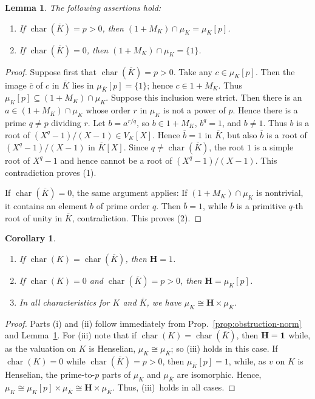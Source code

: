 \documentclass[11pt]{article}
\numberwithin{equation}{section}
\theoremstyle{plain}
\newtheorem{lemma}[theorem]{Lemma}
\newtheorem{corollary}[theorem]{Corollary}
\theoremstyle{remark}
\newcommand{\opn}{\operatorname}
\newcommand{\charr}{\opn{char}}
\newcommand{\ov}{\overline}
\newcommand{\bH}{\mathbf{H}}
\begin{document}
\begin{lemma}
\label{lem:roots-of-unity-s}
\textit{The following assertions hold:}
\begin{enumerate}[font=\normalfont]
\item[(i)] \textit{If $\operatorname{char}(\overline K)=p>0$, then $(1+M_K)\cap\mu_K=\mu_K[p]$.}
\item[(ii)] \textit{If $\operatorname{char}(\overline K)=0$, then $(1+M_K)\cap\mu_K=\{1\}$.}
\end{enumerate}
\end{lemma}
\begin{proof}
Suppose first that $\operatorname{char}(\overline K)=p>0$. Take any $c\in\mu_K[p]$. Then the image $\overline c$ of 
$c$ in $\overline K$ lies in $\mu_{\overline K}[p]=\{1\}$; hence $c\in1+M_K$. Thus 
$\mu_K[p]\subseteq(1+M_K)\cap\mu_K$. 
Suppose this inclusion were strict. Then there is an $a\in(1+M_K)\cap\mu_K$ whose order $r$ in $\mu_K$ is not a 
power of $p$. Hence there is a prime $q\ne p$ dividing $r$. Let $b=a^{r/q}$, so $b\in1+M_K$, $b^q=1$, and $b\ne1$. 
Thus $b$ is a root of $(X^q-1)/(X-1)\in V_K[X]$. Hence $\overline b=1$ in $\overline K$, but also $\overline b$ is a root 
of $(X^q-1)/(X-1)$ in $\overline K[X]$. Since $q\ne \operatorname{char}(\overline K)$, the root $1$ is a simple root 
of $X^q-1$ and hence cannot be a root of $(X^q-1)/(X-1)$. This contradiction proves (1).

If $\operatorname{char}(\overline K)=0$, the same argument applies: If $(1+M_K)\cap\mu_K$ is nontrivial, it contains 
an element $b$ of prime order $q$. Then $\overline b=1$, while $\overline b$ is a primitive $q$-th root of unity in 
$\overline K$, contradiction. This proves (2).
\end{proof}

\begin{corollary}
\label{cor:obstruction}{\phantom{.}}
\begin{enumerate}
 [font=\normalfont]
\item[(i)] If $\operatorname{char}(K)=\operatorname{char}(\overline K)$, then $\mathbf{H}=1$.
\item[(ii)] If $\operatorname{char}(K)=0$ and $\operatorname{char}(\overline K)=p>0$, then $\mathbf{H}=\mu_K[p]$.
\item[(iii)] In all characteristics for $K$ and $\ov K$,   we have $\mu_K \cong \bH \times \mu_{\ov K}$.  
\end{enumerate}
\end{corollary}
\begin{proof}
Parts (i) and (ii)  follow immediately from  Prop.~\ref{prop:obstruction-norm} and Lemma~\ref{lem:roots-of-unity-s}.
For (iii) note that if $\charr(K) = \charr(\ov K)$, then $\bf H = 1$ while,  as the valuation on $K$ is Henselian, 
$\mu_K \cong\mu_{\ov K}$; so (iii) holds in this case.  If $\charr(K) = 0$ while $\charr(\ov K) = p >0$, then 
$\mu_{\ov K}[p] = 1$, while, as $v$ on $K$ is Henselian, the prime-to-$p$ parts of $\mu_K$ and $\mu_{\ov K}$
are isomorphic.  Hence, 
$
\mu_K \cong \mu_K [p] \times \mu_{\ov K} \cong \bH \times \mu_{\ov K}.
$
Thus, (iii)~holds in all cases. 
\end{proof}
\end{document}
